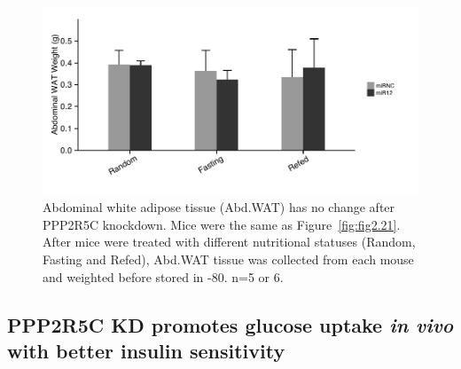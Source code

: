 

\begin{figure}[htbp]
\centering
\includegraphics[width=1\textwidth]{figs/fig2-25 abd wat weight.pdf}
\caption[Abdominal fat after PPP2R5C KD]{\footnotesize Abdominal white adipose tissue (Abd.WAT) has no change after PPP2R5C knockdown. Mice were the same as Figure~\ref{fig:fig2.21}. After mice were treated with different nutritional statuses (Random, Fasting and Refed), Abd.WAT tissue was collected from each mouse and weighted before stored in -80\celsius{}. n=5 or 6.}
\label{fig:fig2.25}
\end{figure}

\subsection{PPP2R5C KD promotes glucose uptake \textit{in vivo} with better insulin sensitivity}

